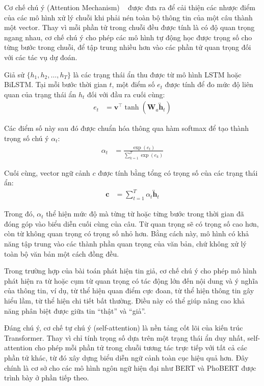 \documentclass[12pt, a4paper]{report}
\begin{document}
Cơ chế chú ý (Attention Mechanism) ~\cite{bahdanau2015attention} được đưa ra để cải thiện các nhược điểm của các mô hình xử lý chuỗi khi phải nén toàn bộ thông tin của một câu thành một vector. Thay vì mỗi phần tử trong chuỗi đều được tính là có độ quan trọng ngang nhau, cơ chế chú ý cho phép các mô hình tự động học được trọng số cho từng bước trong chuỗi, để tập trung nhiều hơn vào các phần tử quan trọng đối với các tác vụ dự đoán.

Giả sử $\{h_1, h_2, \dots, h_T\}$ là các trạng thái ẩn thu được từ mô hình LSTM hoặc BiLSTM. 
Tại mỗi bước thời gian $t$, một điểm số $e_t$ được tính để đo mức độ liên quan của trạng thái ẩn $h_t$ đối với đầu ra cuối cùng:
\begin{align}
  e_t &= \mathbf{v}^{\top} \tanh(\mathbf{W}_a \overleftrightarrow{\mathbf{h}}_t)
\end{align}

Các điểm số này sau đó được chuẩn hóa thông qua hàm softmax để tạo thành trọng số chú ý $\alpha_t$:
\begin{align}
  \alpha_t &= \frac{\exp(e_t)}{\sum_{k=1}^{T} \exp(e_k)}
\end{align}

Cuối cùng, vector ngữ cảnh $c$ được tính bằng tổng có trọng số của các trạng thái ẩn:
\begin{align}
  \mathbf{c} &= \sum_{t=1}^{T} \alpha_t \overleftrightarrow{\mathbf{h}}_t
\end{align}

Trong đó, $\alpha_t$ thể hiện mức độ mà từng từ hoặc từng bước trong thời gian đã đóng góp vào biểu diễn cuối cùng của câu. Từ quan trọng sẽ có trọng số cao hơn, còn từ không quan trọng có trọng số nhỏ hơn. Bằng cách này, mô hình có khả năng tập trung vào các thành phần quan trọng của văn bản, chứ không xử lý toàn bộ văn bản một cách đồng đều.

Trong trường hợp của bài toán phát hiện tin giả, cơ chế chú ý cho phép mô hình phát hiện ra từ hoặc cụm từ quan trọng có tác động lớn đến nội dung và ý nghĩa của thông tin, ví dụ, từ thể hiện quan điểm cực đoan, từ thể hiện thông tin gây hiểu lầm, từ thể hiện chi tiết bất thường. Điều này có thể giúp nâng cao khả năng phân biệt được giữa tin ``thật'' và ``giả''.

Đáng chú ý, cơ chế tự chú ý (self-attention) là nền tảng cốt lõi của kiến trúc Transformer. Thay vì chỉ tính trọng số dựa trên một trạng thái ẩn duy nhất, self-attention cho phép mỗi phần tử trong chuỗi tương tác trực tiếp với tất cả các phần tử khác, từ đó xây dựng biểu diễn ngữ cảnh toàn cục hiệu quả hơn. Đây chính là cơ sở cho các mô hình ngôn ngữ hiện đại như BERT và PhoBERT được trình bày ở phần tiếp theo.
\end{document}
